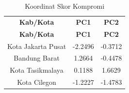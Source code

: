 \begin{longtable}{|c|c|c|}
\caption{Koordinat Skor Kompromi} \label{tab:scores} \\\\
\hline
\textbf{Kab/Kota} & \textbf{PC1} & \textbf{PC2} \\
\hline
\endfirsthead
\hline
\textbf{Kab/Kota} & \textbf{PC1} & \textbf{PC2} \\
\hline
\endhead
\hline
\endfoot
Kota Jakarta Pusat & -2.2496 & -0.3712 \\
Bandung Barat & 1.2664 & -0.4478 \\
Kota Tasikmalaya & 0.1188 & 1.6629 \\
Kota Cilegon & -1.2227 & -1.4783 \\
\hline
\end{longtable}
